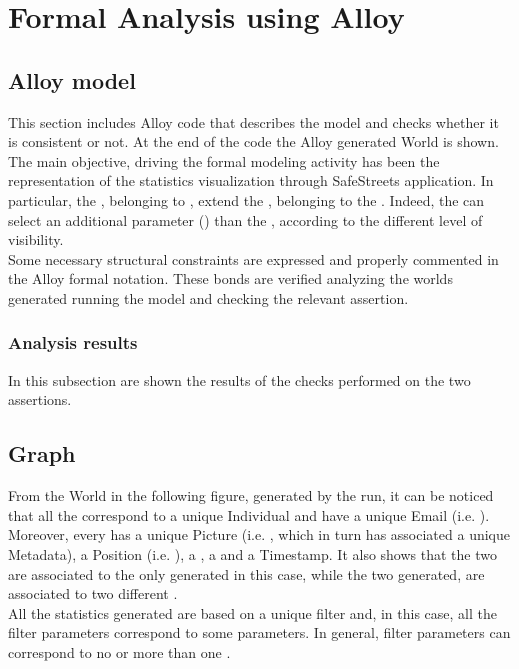 \documentclass[../RASD.tex]{subfiles}
\begin{document}
\chapter{Formal Analysis using Alloy}
\thispagestyle{fancy}
	\section{Alloy model}
	
	This section includes Alloy code that describes the model and checks whether it is consistent or not. At the end of the code the Alloy generated World is shown. \\
	The main objective, driving the formal modeling activity has been the representation of the statistics visualization through SafeStreets application. In particular, the , belonging to , extend the , belonging to the . Indeed, the  can select an additional parameter () than the , according to the different level of visibility. \\
	Some necessary structural constraints are expressed and properly commented in the Alloy formal notation. These bonds are verified analyzing the worlds generated running the model and checking the relevant assertion. \\
	
	

		\subsection{Analysis results}
		
		In this subsection are shown the results of the checks performed on the two assertions. 
	\section{Graph}
	
	From the World in the following figure, generated by the run, it can be noticed that all the  correspond to a unique Individual and have a unique Email (i.e. ). Moreover, every  has a unique Picture (i.e. , which in turn has associated a unique Metadata), a Position (i.e. ), a , a  and a Timestamp. It also shows that the two  are associated to the only  generated in this case, while the two  generated, are associated to two different . \\
	All the statistics generated are based on a unique filter and, in this case, all the filter parameters correspond to some  parameters.
	In general, filter parameters can correspond to no or more than one . 
	
\end{document}
